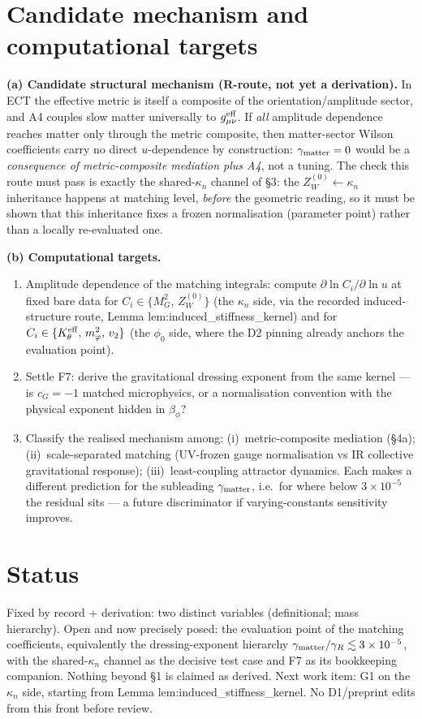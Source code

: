 \documentclass[11pt,a4paper]{article}
\begin{document}
\section{Candidate mechanism and computational targets}
\textbf{(a) Candidate structural mechanism (R-route, not yet a derivation).}
In ECT the effective metric is itself a composite of the orientation/amplitude
sector, and A4 couples slow matter universally to $g^{\rm eff}_{\mu\nu}$. If
\emph{all} amplitude dependence reaches matter only through the metric
composite, then matter-sector Wilson coefficients carry no direct
$u$-dependence by construction: $\gamma_{\rm matter}=0$ would be a
\emph{consequence of metric-composite mediation plus A4}, not a tuning. The
check this route must pass is exactly the shared-$\kappa_n$ channel of \S3: the
$Z_W^{(0)}\!\leftarrow\!\kappa_n$ inheritance happens at matching level,
\emph{before} the geometric reading, so it must be shown that this inheritance
fixes a frozen normalisation (parameter point) rather than a locally
re-evaluated one.

\textbf{(b) Computational targets.}
\begin{enumerate}[leftmargin=1.9em,itemsep=2pt,label=\textbf{G\arabic*.}]
\item Amplitude dependence of the matching integrals: compute
$\partial\ln C_i/\partial\ln u$ at fixed bare data for
$C_i\in\{M_G^2,\,Z_W^{(0)}\}$ (the $\kappa_n$ side, via the recorded
induced-structure route, Lemma lem:induced\_stiffness\_kernel) and for
$C_i\in\{K_\theta^{\rm eff},\,m_\varphi^2,\,v_2\}$ (the $\phi_0$ side, where the
D2 pinning already anchors the evaluation point).
\item Settle F7: derive the gravitational dressing exponent from the same
kernel --- is $c_G=-1$ matched microphysics, or a normalisation convention with
the physical exponent hidden in $\beta_\phi$?
\item Classify the realised mechanism among: (i)~metric-composite mediation
(\S4a); (ii)~scale-separated matching (UV-frozen gauge normalisation vs IR
collective gravitational response); (iii)~least-coupling attractor dynamics.
Each makes a different prediction for the subleading $\gamma_{\rm matter}$,
i.e.\ for where below $3\times10^{-5}$ the residual sits --- a future
discriminator if varying-constants sensitivity improves.
\end{enumerate}

\section{Status}
Fixed by record + derivation: two distinct variables (definitional; mass
hierarchy). Open and now precisely posed: the evaluation point of the matching
coefficients, equivalently the dressing-exponent hierarchy
$\gamma_{\rm matter}/\gamma_R\lesssim3\times10^{-5}$, with the shared-$\kappa_n$
channel as the decisive test case and F7 as its bookkeeping companion. Nothing
beyond \S1 is claimed as derived. Next work item: G1 on the $\kappa_n$ side,
starting from Lemma lem:induced\_stiffness\_kernel. No D1/preprint edits from
this front before review.
\end{document}

